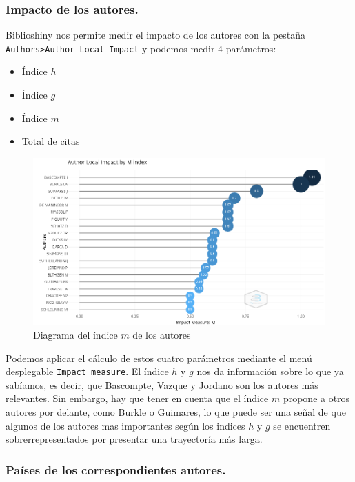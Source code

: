 \documentclass[
]{article}
\providecommand{\tightlist}{%
  \setlength{\itemsep}{0pt}\setlength{\parskip}{0pt}}
\begin{document}
\hypertarget{impacto-de-los-autores.}{%
\subsubsection{Impacto de los autores.}\label{impacto-de-los-autores.}}

Biblioshiny nos permite medir el impacto de los autores con la pestaña
\texttt{Authors\textgreater{}Author\ Local\ Impact} y podemos medir 4
parámetros:

\begin{itemize}
\tightlist
\item
  Índice \(h\)
\item
  Índice \(g\)
\item
  Índice \(m\)
\item
  Total de citas
\end{itemize}

\begin{figure}
\centering
\includegraphics{AuthorsLocalImpactByMIndex.png}
\caption{Diagrama del índice \(m\) de los autores}
\end{figure}

Podemos aplicar el cálculo de estos cuatro parámetros mediante el menú
desplegable \texttt{Impact\ measure}. El índice \(h\) y \(g\) nos da
información sobre lo que ya sabíamos, es decir, que Bascompte, Vazque y
Jordano son los autores más relevantes. Sin embargo, hay que tener en
cuenta que el índice \(m\) propone a otros autores por delante, como
Burkle o Guimares, lo que puede ser una señal de que algunos de los
autores mas importantes según los indices \(h\) y \(g\) se encuentren
sobrerrepresentados por presentar una trayectoría más larga.

\hypertarget{pauxedses-de-los-correspondientes-autores.}{%
\subsubsection{Países de los correspondientes
autores.}\label{pauxedses-de-los-correspondientes-autores.}}
\end{document}
